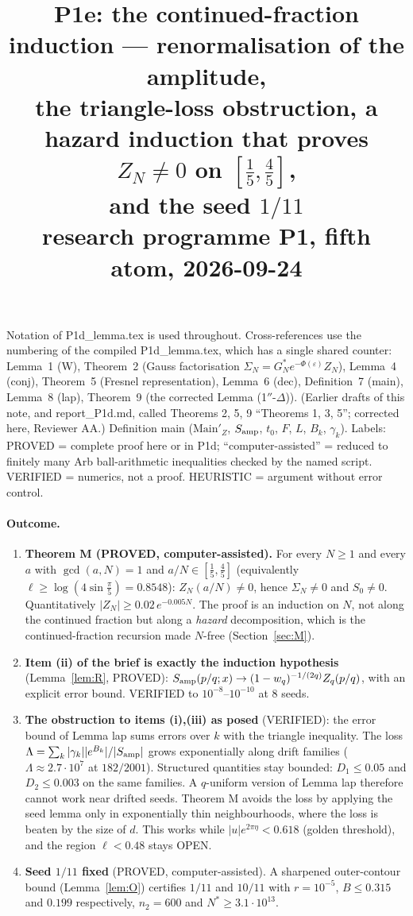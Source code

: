 \documentclass[11pt]{article}
\title{P1e: the continued-fraction induction --- renormalisation of the amplitude,\\ the triangle-loss obstruction, a hazard induction that proves $Z_N\neq0$ on $[\tfrac15,\tfrac45]$,\\ and the seed $1/11$\\ \small research programme P1, fifth atom, 2026-09-24}
\date{}
\theoremstyle{definition}\newtheorem{definition}[theorem]{Definition}
\theoremstyle{remark}\newtheorem{remark}[theorem]{Remark}
\begin{document}
\maketitle

Notation of P1d\_lemma.tex is used throughout. Cross-references use the numbering of the compiled P1d\_lemma.tex, which has a single shared counter: Lemma~1 (W), Theorem~2 (Gauss factorisation $\Sigma_N=G^*_Ne^{-\Phi(\varepsilon)}Z_N$), Lemma~4 (conj), Theorem~5 (Fresnel representation), Lemma~6 (dec), Definition~7 (main), Lemma~8 (lap), Theorem~9 (the corrected Lemma (1$''$-$\Delta$)). (Earlier drafts of this note, and report\_P1d.md, called Theorems 2, 5, 9 ``Theorems 1, 3, 5''; corrected here, Reviewer AA.) Definition main ($\mathrm{Main}'_Z$, $S_{\rm amp}$, $t_0$, $F$, $L$, $B_k$, $\gamma_k$).
Labels: PROVED = complete proof here or in P1d; ``computer-assisted'' = reduced to finitely many Arb ball-arithmetic inequalities checked by the named script. VERIFIED = numerics, not a proof. HEURISTIC = argument without error control.

\paragraph{Outcome.}
\begin{enumerate}
\item[(a)] \textbf{Theorem M (PROVED, computer-assisted).} For every $N\ge1$ and every $a$ with $\gcd(a,N)=1$ and $a/N\in[\frac15,\frac45]$ (equivalently $\ell\ge\log(4\sin\frac\pi5)=0.8548$): $Z_N(a/N)\ne0$, hence $\Sigma_N\ne0$ and $S_0\ne0$. Quantitatively $|Z_N|\ge0.02\,e^{-0.005N}$.
The proof is an induction on $N$, not along the continued fraction but along a \emph{hazard} decomposition, which is the continued-fraction recursion made $N$-free (Section~\ref{sec:M}).
\item[(b)] \textbf{Item (ii) of the brief is exactly the induction hypothesis} (Lemma~\ref{lem:R}, PROVED): $S_{\rm amp}(p/q;x)\to(1-w_q)^{-1/(2q)}Z_q(p/q)$, with an explicit error bound. VERIFIED to $10^{-8}$--$10^{-10}$ at 8 seeds.
\item[(c)] \textbf{The obstruction to items (i),(iii) as posed} (VERIFIED): the error bound of Lemma lap sums errors over $k$ with the triangle inequality. The loss $\Lambda=\sum_k|\gamma_k||e^{B_k}|/|S_{\rm amp}|$ grows exponentially along drift families ($\Lambda\approx2.7\cdot10^7$ at $182/2001$). Structured quantities stay bounded: $D_1\le0.05$ and $D_2\le0.003$ on the same families. A $q$-uniform version of Lemma lap therefore cannot work near drifted seeds. Theorem M avoids the loss by applying the seed lemma only in exponentially thin neighbourhoods, where the loss is beaten by the size of $d$. This works while $|u|e^{2\pi\eta}<0.618$ (golden threshold), and the region $\ell<0.48$ stays OPEN.
\item[(d)] \textbf{Seed $1/11$ fixed} (PROVED, computer-assisted). A sharpened outer-contour bound (Lemma~\ref{lem:O}) certifies $1/11$ and $10/11$ with $r=10^{-5}$, $B\le0.315$ and $0.199$ respectively, $n_2=600$ and $N^*\ge3.1\cdot10^{13}$.
\end{enumerate}
\end{document}
